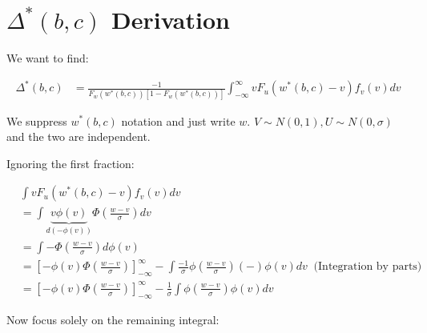 \documentclass{article}
\begin{document}
    
\section*{$\Delta^*(b,c)$ Derivation}
We want to find:

\begin{align*}
    \Delta^*(b,c) &= \frac{
        -1
    }{
        F_w(w^*(b,c)) [1 - F_w(w^*(b,c))]
    } \int^\infty_{-\infty} vF_u(w^*(b,c) - v) f_v(v) dv
\end{align*}

We suppress $w^*(b,c)$ notation and just write $w$. $V \sim N(0, 1), U \sim N(0, \sigma)$ 
and the two are independent.


Ignoring the first fraction:

\begin{align*}
    &\int vF_u(w^*(b,c) - v) f_v(v) dv \\
    &= 
    \int \underbrace{v \phi(v)}_{d(-\phi(v))} \Phi\left(\frac{w-v}{\sigma}\right) dv \\
    &= \int - \Phi\left(\frac{w-v}{\sigma}\right) d \phi(v) \\
    &= \left[
        -\phi(v) \Phi\left(\frac{w-v}{\sigma}\right) 
    \right]^\infty_{-\infty} - \int \frac{-1}{\sigma}\phi\left(\frac{w - v}{\sigma}\right) (-) \phi(v) dv \ \text{ (Integration by parts)} \\ 
    &= \left[
        -\phi(v) \Phi\left(\frac{w-v}{\sigma}\right) 
    \right]^\infty_{-\infty} -\frac{1}{\sigma} \int \phi\left(\frac{w - v}{\sigma}\right) \phi(v) dv 
\end{align*}


Now focus solely on the remaining integral:
\end{document}
